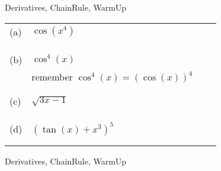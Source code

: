 \begin{tagblock}{Derivatives, ChainRule, WarmUp}
\begin{question}
\begin{enumerate}
\begin{tabular}{|l l | c| c| }
(a) & $\cos(x^4)$ && \\ 
&&&\\
&&&\\ \hline 
&&&\\

(b) & $\cos^4(x)$ && \\
&remember $\cos^4(x) = (\cos (x))^4$ &&\\
&&&\\ \hline
&&&\\
(c) & $\sqrt{3x-1}$  &
& \\ 
&&&\\
&&&\\ \hline
&&&\\

(d) & $(\tan(x) + x^3)^5$ &&\\ 
&&&\\  
&&&\\ \hline
\end{tabular} 

\end{enumerate}


	
\begin{tags}
	    Derivatives, ChainRule, WarmUp
\end{tags}
	
\begin{diary}
\end{diary}
	
\begin{solution}
	   
\end{solution}
	
\end{question}

\end{tagblock}


